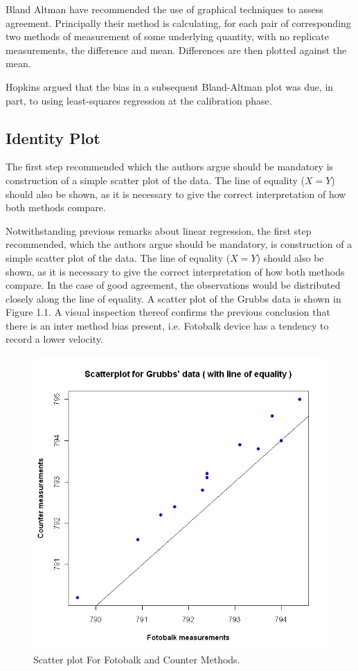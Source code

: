 \documentclass[Main.tex]{subfiles}
\begin{document}
Bland Altman have recommended the use of graphical techniques to assess agreement.
Principally their method is calculating, for each pair of corresponding two methods of measurement of some underlying quantity, with no replicate measurements, the difference and mean. Differences are then plotted against the mean.

Hopkins argued that the bias in a subsequent Bland-Altman plot was due, in part, to using least-squares regression at the calibration
phase.


\subsection{Identity Plot}
The first step recommended which the authors argue should be mandatory is construction of a simple scatter plot of the data.
The line of equality ($X=Y$) should also be shown, as it is	necessary to give the correct interpretation of how both methods
compare. 

Notwithstanding previous remarks about linear regression, the first step recommended, which the authors argue should be mandatory, is construction of a simple scatter plot of the data. The line of equality ($X=Y$) should also be shown, as it is necessary to give the correct interpretation of how both methods compare. In the case of good agreement, the observations would be distributed closely along the line of equality. A scatter plot of the Grubbs data is shown in Figure 1.1. A visual inspection thereof confirms the previous conclusion that there is an inter method bias present, i.e. Fotobalk device has a tendency to record a lower velocity.

\begin{figure}[h!]
	\begin{center}
		\includegraphics[width=130mm]{images/GrubbsScatter.jpeg}
		\caption{Scatter plot For Fotobalk and Counter Methods.}\label{GrubbsScatter}
	\end{center}
\end{figure}
\end{document}
